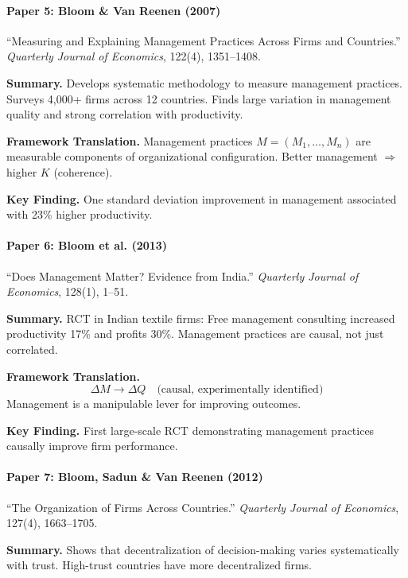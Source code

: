 \paragraph{Paper 5: Bloom \& Van Reenen (2007)}

``Measuring and Explaining Management Practices Across Firms and Countries.''
\textit{Quarterly Journal of Economics}, 122(4), 1351--1408.

\textbf{Summary.}
Develops systematic methodology to measure management practices. Surveys 4,000+
firms across 12 countries. Finds large variation in management quality and strong
correlation with productivity.

\textbf{Framework Translation.}
Management practices $M = (M_1, \ldots, M_n)$ are measurable components of organizational
configuration. Better management $\Rightarrow$ higher $K$ (coherence).

\textbf{Key Finding.}
One standard deviation improvement in management associated with 23\% higher productivity.

\paragraph{Paper 6: Bloom et al. (2013)}

``Does Management Matter? Evidence from India.''
\textit{Quarterly Journal of Economics}, 128(1), 1--51.

\textbf{Summary.}
RCT in Indian textile firms: Free management consulting increased productivity 17\%
and profits 30\%. Management practices are causal, not just correlated.

\textbf{Framework Translation.}
\begin{equation}
  \Delta M \rightarrow \Delta Q \quad \text{(causal, experimentally identified)}
\end{equation}
Management is a manipulable lever for improving outcomes.

\textbf{Key Finding.}
First large-scale RCT demonstrating management practices causally improve firm performance.

\paragraph{Paper 7: Bloom, Sadun \& Van Reenen (2012)}

``The Organization of Firms Across Countries.''
\textit{Quarterly Journal of Economics}, 127(4), 1663--1705.

\textbf{Summary.}
Shows that decentralization of decision-making varies systematically with trust.
High-trust countries have more decentralized firms.

